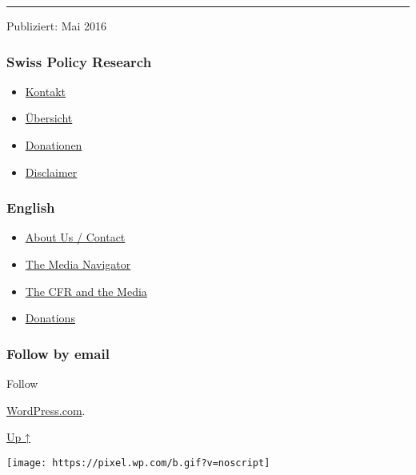 \begin{center}\rule{0.5\linewidth}{\linethickness}\end{center}

Publiziert: Mai 2016

\hypertarget{swiss-policy-research}{%
\subsubsection{Swiss Policy Research}\label{swiss-policy-research}}

\begin{itemize}
\tightlist
\item
  \href{https://swprs.org/kontakt/}{Kontakt}
\item
  \href{https://swprs.org/uebersicht/}{Übersicht}
\item
  \href{https://swprs.org/donationen/}{Donationen}
\item
  \href{https://swprs.org/disclaimer/}{Disclaimer}
\end{itemize}

\hypertarget{english}{%
\subsubsection{English}\label{english}}

\begin{itemize}
\tightlist
\item
  \href{https://swprs.org/contact/}{About Us / Contact}
\item
  \href{https://swprs.org/media-navigator/}{The Media Navigator}
\item
  \href{https://swprs.org/the-american-empire-and-its-media/}{The CFR
  and the Media}
\item
  \href{https://swprs.org/donations/}{Donations}
\end{itemize}

\hypertarget{follow-by-email}{%
\subsubsection{Follow by email}\label{follow-by-email}}

Follow

\href{https://wordpress.com/?ref=footer_custom_com}{WordPress.com}.

\protect\hyperlink{}{Up ↑}

\texttt{[image: https://pixel.wp.com/b.gif?v=noscript]}
